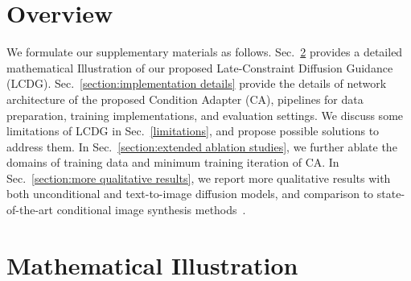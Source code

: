 \documentclass{article}
\begin{document}
{\small


}

\clearpage
\setcounter{section}{0}
\renewcommand\thesection{\Alph{section}}
\section{Overview}
We formulate our supplementary materials as follows. Sec.~\ref{section:mathematical derivation} provides a detailed mathematical Illustration of our proposed Late-Constraint Diffusion Guidance (LCDG). Sec.~\ref{section:implementation details} provide the details of network architecture of the proposed Condition Adapter (CA), pipelines for data preparation, training implementations, and evaluation settings. We discuss some limitations of LCDG in Sec.~\ref{limitations}, and propose possible solutions to address them. In Sec.~\ref{section:extended ablation studies}, we further ablate the domains of training data and minimum training iteration of CA. In Sec.~\ref{section:more qualitative results}, we report more qualitative results with both unconditional and text-to-image diffusion models, and comparison to state-of-the-art conditional image synthesis methods~\cite{rombach2022high,mou2023t2i,zhang2023adding}.

\section{Mathematical Illustration}
\label{section:mathematical derivation}
\end{document}
